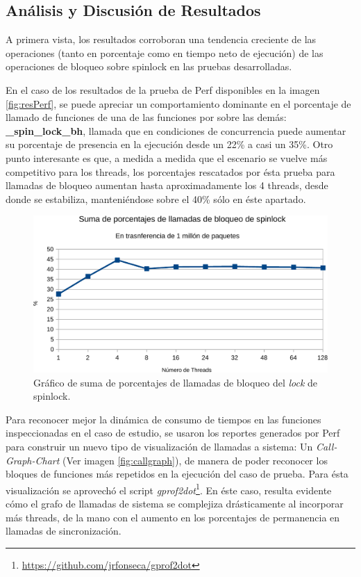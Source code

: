 \subsection{Análisis y Discusión de Resultados}
A primera vista, los resultados corroboran una tendencia creciente de las operaciones (tanto en porcentaje como en tiempo neto de ejecución) de las operaciones de bloqueo sobre spinlock en las pruebas desarrolladas.

En el caso de los resultados de la prueba de Perf disponibles en la imagen \ref{fig:resPerf}, se puede apreciar un comportamiento dominante en el porcentaje de llamado de funciones de una de las funciones por sobre las demás: \textbf{\_spin\_lock\_bh}, llamada que en condiciones de concurrencia puede aumentar su porcentaje de presencia en la ejecución desde un 22\% a casi un 35\%. Otro punto interesante es que, a medida a medida que el escenario se vuelve más competitivo para los threads, los porcentajes rescatados por ésta prueba para llamadas de bloqueo aumentan hasta aproximadamente los 4 threads, desde donde se estabiliza, manteniéndose sobre el 40\% sólo en éste apartado.

\begin{figure}[!h]
	\centering
	\includegraphics[scale=.6]{resultados/sumaperf-crop.pdf}
	\caption{Gráfico de suma de porcentajes de llamadas de bloqueo del \emph{lock} de spinlock.}
	\label{fig:sumaperf}
\end{figure}

Para reconocer mejor la dinámica de consumo de tiempos en las funciones inspeccionadas en el caso de estudio, se usaron los reportes generados por Perf para construir un nuevo tipo de visualización de llamadas a sistema: Un \emph{Call-Graph-Chart} (Ver imagen \ref{fig:callgraph}), de manera de poder reconocer los bloques de funciones más repetidos en la ejecución del caso de prueba. Para ésta visualización se aprovechó el script \emph{gprof2dot}\footnote{\url{https://github.com/jrfonseca/gprof2dot}}. En éste caso, resulta evidente cómo el grafo de llamadas de sistema se complejiza drásticamente al incorporar más threads, de la mano con el aumento en los porcentajes de permanencia en llamadas de sincronización.

